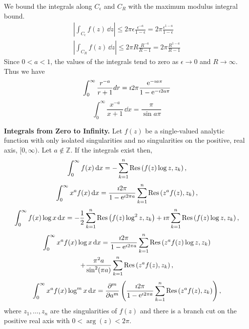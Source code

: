 \begin{Example}
  We bound the integrals along $C_\epsilon$ and $C_R$ with the maximum modulus integral
  bound.
  \begin{gather*}
    \left| \int_{C_\epsilon} f(z) \,\dd z \right| 
    \leq 2 \pi \epsilon \frac{\epsilon^{-a}}{1-\epsilon} 
    = 2 \pi \frac{\epsilon^{1-a}}{1-\epsilon} \\
    \left| \int_{C_R} f(z)\,\dd z \right| 
    \leq 2 \pi R \frac{R^{-a}}{R-1}
    = 2 \pi \frac{R^{1-a}}{R-1}
  \end{gather*}
  Since $0<a<1$, the values of the integrals tend to zero as 
  $\epsilon \to 0$ and $R \to \infty$.  Thus we have
  \[
  \int_0^\infty \frac{r^{-a}}{r+1}dr =
  \imath 2 \pi \frac{\mathop{\mathrm{e}}\nolimits^{- \imath a \pi}}{1-\mathop{\mathrm{e}}\nolimits^{- \imath 2 a \pi}}
  \]
  \[
  \int_0^\infty \frac{x^{-a}}{x+1} \,\dd x = \frac{\pi}{\sin a\pi} 
  \]
\end{Example}











\begin{Result}
  \label{int_from_zero_to_infinity}
  \textbf{Integrals from Zero to Infinity.} 
  Let $f(z)$ be a single-valued analytic function with only isolated 
  singularities and no singularities on the positive, real axis, 
  $[0,\infty)$.  Let $a \not\in \mathbb{Z}$.  If the integrals exist then,
  \[
  \int_0^\infty f(x) \,\mathrm{d} x = - \sum_{k = 1}^n \mathop{\mathrm{Res}}\nolimits\left(f(z) \log z, z_k\right),
  \]
  \[
  \int_0^\infty x^a f(x) \,\mathrm{d} x = \frac{\imath 2 \pi}{1 - \mathop{\mathrm{e}}\nolimits^{\imath 2 \pi a} }
  \sum_{k = 1}^n \mathop{\mathrm{Res}}\nolimits\left(z^a f(z), z_k\right),
  \]
  \[
  \int_0^\infty f(x) \log x \,\mathrm{d} x 
  = - \frac{1}{2} \sum_{k = 1}^n \mathop{\mathrm{Res}}\nolimits\left(f(z) \log^2 z, z_k\right) 
  + \imath \pi \sum_{k = 1}^n \mathop{\mathrm{Res}}\nolimits\left(f(z) \log z, z_k\right),
  \]
  \begin{multline*}
    \int_0^\infty x^a f(x) \log x \,\mathrm{d} x
    = \frac{ \imath 2 \pi }{ 1 - \mathop{\mathrm{e}}\nolimits^{\imath 2 \pi a} }
    \sum_{k=1}^n \mathop{\mathrm{Res}}\nolimits \left( z^a f(z) \log z, z_k \right) \\
    + \frac{ \pi^2 a }{ \sin^2 (\pi a) }
    \sum_{k=1}^n \mathop{\mathrm{Res}}\nolimits \left( z^a f(z), z_k \right),
  \end{multline*}
  \[
  \int_0^\infty x^a f(x) \log^m x\,\mathrm{d} x
  = \frac{\partial^m}{\partial a^m} \left(\frac{ \imath 2 \pi }{ 1 - \mathop{\mathrm{e}}\nolimits^{\imath 2 \pi a} }
    \sum_{k=1}^n \mathop{\mathrm{Res}}\nolimits \left( z^a f(z), z_k \right) \right),
  \]
  where $z_1, \ldots, z_n$ are the singularities of $f(z)$ and there is 
  a branch cut on the positive real axis with $0 < \arg(z) < 2\pi$.
\end{Result}



